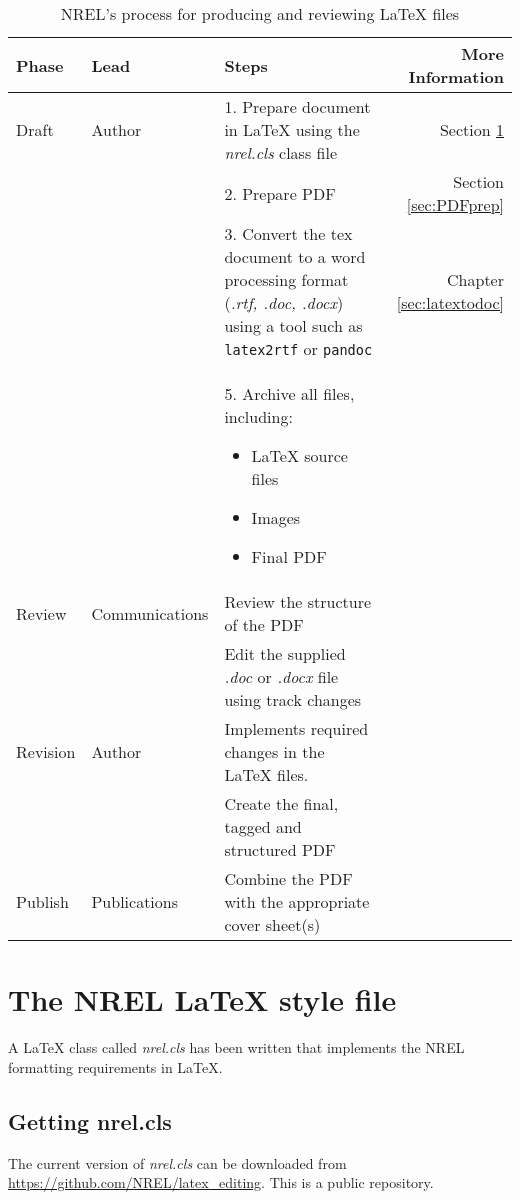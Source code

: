 \begin{table}[!h]
\centering
\caption{NREL's process for producing and reviewing LaTeX{} files}
\label{Tab:NRELprocess}
\begin{tabular*}{\textwidth}{llp{}r}
\toprule
Phase & Lead & Steps & More Information \\
\midrule
Draft & Author & 1. Prepare document in LaTeX using the \emph{nrel.cls} class file & Section \ref{sec:nrelcls} \\
 & & 2. Prepare PDF & Section \ref{sec:PDFprep} \\
 & & 3. Convert the tex document to a word processing format (\emph{.rtf, .doc, .docx}) using a tool such as  \texttt{latex2rtf} or \texttt{pandoc} & Chapter \ref{sec:latextodoc}\\
 & & 5. Archive all files, including:
\begin{itemize}  
 \item LaTeX source files
 \item Images
 \item Final PDF 
 \end{itemize} & \\
Review & Communications & Review the structure of the PDF & \\
 & & Edit the supplied \emph{.doc} or \emph{.docx} file using track changes & \\
Revision & Author & Implements required changes in the LaTeX files. & \\
&  & Create the final, tagged and structured PDF \\
Publish & Publications & Combine the PDF with the appropriate cover sheet(s) & \\
\bottomrule
\end{tabular*}
\end{table}

\section{The NREL LaTeX style file}\label{sec:nrelcls}
A LaTeX class called \emph{nrel.cls} has been written that implements the NREL formatting requirements in LaTeX.

\subsection{Getting nrel.cls}
The current version of \emph{nrel.cls} can be downloaded from \href{https://github.com/NREL/latex_editing}{https://github.com/NREL/latex\_editing}. This is a public repository.

